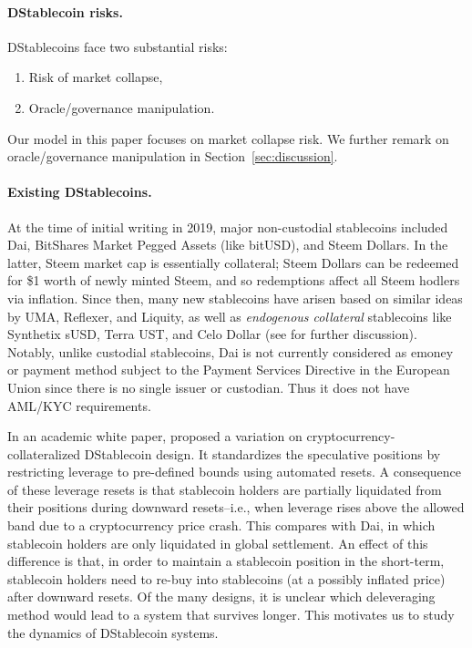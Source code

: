 \paragraph{DStablecoin risks.}
DStablecoins face two substantial risks:
\begin{enumerate}
	\item Risk of market collapse,
	\item Oracle/governance manipulation.
\end{enumerate}
Our model in this paper focuses on market collapse risk. We further remark on oracle/governance manipulation in Section~\ref{sec:discussion}.

\paragraph{Existing DStablecoins.}
At the time of initial writing in 2019, major non-custodial stablecoins included Dai, BitShares Market Pegged Assets (like bitUSD), and Steem Dollars. In the latter, Steem market cap is essentially collateral; Steem Dollars can be redeemed for \$1 worth of newly minted Steem, and so redemptions affect all Steem hodlers via inflation. Since then, many new stablecoins have arisen based on similar ideas by UMA, Reflexer, and Liquity, as well as \emph{endogenous collateral} stablecoins like Synthetix sUSD, Terra UST, and Celo Dollar (see \cite{klagesmundt2020stablecoins} for further discussion). Notably, unlike custodial stablecoins, Dai is not currently considered as emoney or payment method subject to the Payment Services Directive in the European Union since there is no single issuer or custodian. Thus it does not have AML/KYC requirements.

In an academic white paper, \cite{cao2018} proposed a variation on cryptocurrency-collateralized DStablecoin design. It standardizes the speculative positions by restricting leverage to pre-defined bounds using automated resets. A consequence of these leverage resets is that stablecoin holders are partially liquidated from their positions during downward resets--i.e., when leverage rises above the allowed band due to  a cryptocurrency price crash. This compares with Dai, in which stablecoin holders are only liquidated in global settlement. An effect of this difference is that, in order to maintain a stablecoin position in the short-term, stablecoin holders need to re-buy into stablecoins (at a possibly inflated price) after downward resets. Of the many designs, it is unclear which deleveraging method would lead to a system that survives longer. This motivates us to study the dynamics of DStablecoin systems.


